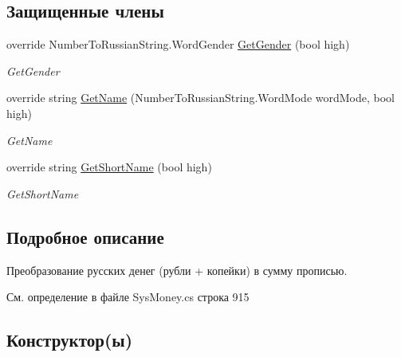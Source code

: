 \subsection*{Защищенные члены}
\begin{DoxyCompactItemize}
\item 
override Number\+To\+Russian\+String.\+Word\+Gender \mbox{\hyperlink{class_f_b_a_1_1_rouble_to_string_provider_ae13f3d59cbca7fff82d3a20ad4e8b0d0}{Get\+Gender}} (bool high)
\begin{DoxyCompactList}\small\item\em Get\+Gender \end{DoxyCompactList}\item 
override string \mbox{\hyperlink{class_f_b_a_1_1_rouble_to_string_provider_ac31a975f1a81e576344d431956bd6e5a}{Get\+Name}} (Number\+To\+Russian\+String.\+Word\+Mode word\+Mode, bool high)
\begin{DoxyCompactList}\small\item\em Get\+Name \end{DoxyCompactList}\item 
override string \mbox{\hyperlink{class_f_b_a_1_1_rouble_to_string_provider_ab07e18dc82b66cbd58a7bcbd4a049c5f}{Get\+Short\+Name}} (bool high)
\begin{DoxyCompactList}\small\item\em Get\+Short\+Name \end{DoxyCompactList}\end{DoxyCompactItemize}


\subsection{Подробное описание}
Преобразование русских денег (рубли + копейки) в сумму прописью. 



См. определение в файле Sys\+Money.\+cs строка 915



\subsection{Конструктор(ы)}
\mbox{\label{class_f_b_a_1_1_rouble_to_string_provider_a3916fcca77df7a8fc22651de89e06022}} 
